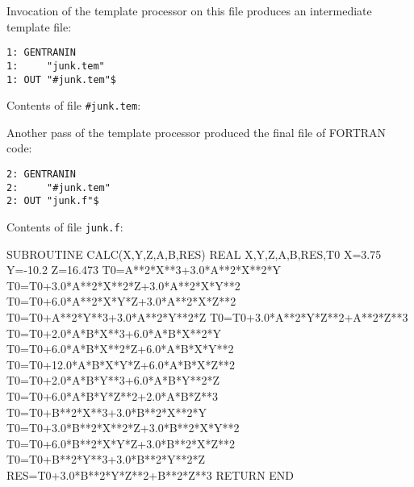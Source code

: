 Invocation of the template processor on this file produces an
intermediate template file:
\begin{verbatim}
1: GENTRANIN 
1:     "junk.tem" 
1: OUT "#junk.tem"$ 
\end{verbatim}
Contents of file {\tt \#junk.tem}:
Another pass of the template processor produced the final file of FORTRAN
code:
\begin{verbatim}
2: GENTRANIN 
2:     "#junk.tem" 
2: OUT "junk.f"$ 
\end{verbatim}
Contents of file {\tt junk.f}:
\begin{framedverbatim}
      SUBROUTINE CALC(X,Y,Z,A,B,RES)          
      REAL X,Y,Z,A,B,RES,T0                 
      X=3.75                                  
      Y=-10.2                                 
      Z=16.473                                
      T0=A**2*X**3+3.0*A**2*X**2*Y            
      T0=T0+3.0*A**2*X**2*Z+3.0*A**2*X*Y**2   
      T0=T0+6.0*A**2*X*Y*Z+3.0*A**2*X*Z**2    
      T0=T0+A**2*Y**3+3.0*A**2*Y**2*Z         
      T0=T0+3.0*A**2*Y*Z**2+A**2*Z**3         
      T0=T0+2.0*A*B*X**3+6.0*A*B*X**2*Y       
      T0=T0+6.0*A*B*X**2*Z+6.0*A*B*X*Y**2     
      T0=T0+12.0*A*B*X*Y*Z+6.0*A*B*X*Z**2     
      T0=T0+2.0*A*B*Y**3+6.0*A*B*Y**2*Z       
      T0=T0+6.0*A*B*Y*Z**2+2.0*A*B*Z**3       
      T0=T0+B**2*X**3+3.0*B**2*X**2*Y         
      T0=T0+3.0*B**2*X**2*Z+3.0*B**2*X*Y**2   
      T0=T0+6.0*B**2*X*Y*Z+3.0*B**2*X*Z**2    
      T0=T0+B**2*Y**3+3.0*B**2*Y**2*Z         
      RES=T0+3.0*B**2*Y*Z**2+B**2*Z**3        
      RETURN                                  
      END                                     
\end{framedverbatim} 


